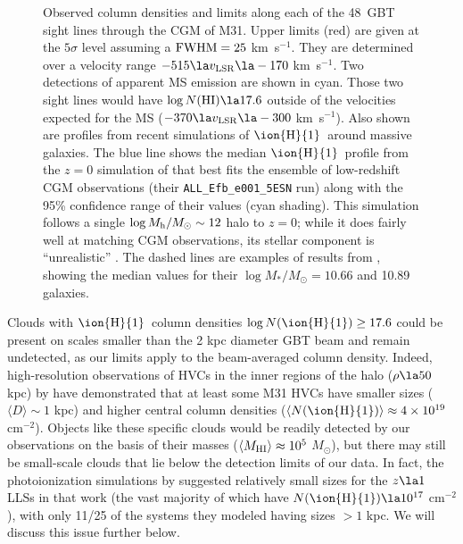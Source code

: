 \documentclass[12pt,preprint]{aastex6}
\newcommand{\qsonumber}{48}
\newcommand{\HI}{\ensuremath{\mbox{\ion{H}{1}}}}
\newcommand{\NHI}{\ensuremath{N(\mbox{\ion{H}{1}})}\relax}
\newcommand{\logNHI}{\ensuremath{\log N(\mbox{\ion{H}{1}})}\relax}
\newcommand{\msun}{\ensuremath{M_\odot}\relax}
\newcommand{\column}{cm$^{-2}$}
\newcommand{\kms}{km~s$^{-1}$}
\newcommand{\vlsr}{\ensuremath{v_{\rm LSR}\relax}}
\begin{document}

\begin{figure}[b]
\caption{Observed column densities and limits along each of the
  \qsonumber\ GBT sight lines through the CGM of M31. Upper limits
  (red) are given at the $5\sigma$ level assuming a ${\rm FWHM} = 25$
  \kms. They are determined over a velocity range
  $-515 \la \vlsr \la -170$ \kms. Two detections of apparent MS
  emission are shown in cyan. Those two sight lines would have
  $\log N({\rm H I}) \la 17.6$ outside of the velocities expected for
  the MS ($-370 \la \vlsr \la -300$ \kms). Also shown are profiles
  from recent simulations of \HI\ around massive galaxies. The blue
  line shows the median \HI\ profile from the $z=0$ simulation of
  \citet{liang2016} that best fits the ensemble of low-redshift CGM
  observations (their {\tt ALL\_Efb\_e001\_5ESN} run) along with the
  95\% confidence range of their values (cyan shading). This
  simulation follows a single $\log M_{\rm h}/M_\odot \sim 12$ halo to
  $z=0$; while it does fairly well at matching CGM observations, its
  stellar component is ``unrealistic'' \citep{liang2016}. The dashed
  lines are examples of results from \citet{gutcke2016}, showing the
  median values for their $\log M_*/M_\odot = 10.66$ and 10.89
  galaxies.  \label{fig:columnrho}}
\end{figure}


Clouds with \HI\ column densities $\logNHI \ge 17.6$ could be present
on scales smaller than the 2 kpc diameter GBT beam and remain
undetected, as our limits apply to the beam-averaged column
density. Indeed, high-resolution observations of HVCs in the inner
regions of the halo ($\rho \la 50$ kpc) by \citet{westmeier2005} have
demonstrated that at least some M31 HVCs have smaller sizes
($\langle D \rangle \sim 1$ kpc) and higher central column densities
($\langle \NHI \rangle \approx 4\times10^{19}$ \column). Objects like
these specific clouds would be readily detected by our observations on
the basis of their masses ($\langle M_{\rm HI} \rangle \approx 10^5$
\msun), but there may still be small-scale clouds that lie below the
detection limits of our data. In fact, the photoionization simulations
by \cite{lehner2013} suggested relatively small sizes for the $z\la1$
LLSs in that work (the vast majority of which have
$N(\mbox{\HI}) \la 10^{17}$ \column), with only 11/25 of the systems
they modeled having sizes $>1$ kpc. We will discuss this issue further
below.
\end{document}
